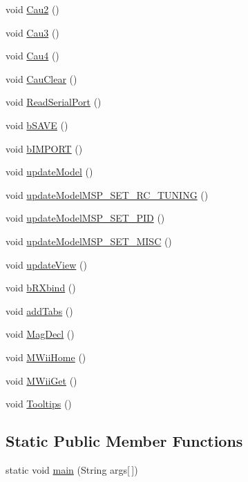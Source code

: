 \begin{DoxyCompactItemize}
\item 
void \hyperlink{classMultiWiiConf_ac0581f16afefe73eda1d9fd3c49619e9}{Cau2} ()
\item 
void \hyperlink{classMultiWiiConf_a390839149da4f3010a44ae9198224d82}{Cau3} ()
\item 
void \hyperlink{classMultiWiiConf_a52188c481473e6840c32819a1bb59b87}{Cau4} ()
\item 
void \hyperlink{classMultiWiiConf_a4f7d659bc40a7a1d3ea1578302f85897}{Cau\-Clear} ()
\item 
void \hyperlink{classMultiWiiConf_acdf30272639726614b0b6c817a61d791}{Read\-Serial\-Port} ()
\item 
void \hyperlink{classMultiWiiConf_a1fce4aba9f4303d1859ed3122f6d6cf5}{b\-S\-A\-V\-E} ()
\item 
void \hyperlink{classMultiWiiConf_a6cdbed88e5d94db4ee58b70f299f5dc0}{b\-I\-M\-P\-O\-R\-T} ()
\item 
void \hyperlink{classMultiWiiConf_ae152c1f5d8b20485ff92a20b8d15f9fb}{update\-Model} ()
\item 
void \hyperlink{classMultiWiiConf_a02f7cd92c516edf9ba014433209c5e66}{update\-Model\-M\-S\-P\-\_\-\-S\-E\-T\-\_\-\-R\-C\-\_\-\-T\-U\-N\-I\-N\-G} ()
\item 
void \hyperlink{classMultiWiiConf_a757bd807090b63a8142667d090b41542}{update\-Model\-M\-S\-P\-\_\-\-S\-E\-T\-\_\-\-P\-I\-D} ()
\item 
void \hyperlink{classMultiWiiConf_a57633ac74ed66b9f52afe79aec9d6f56}{update\-Model\-M\-S\-P\-\_\-\-S\-E\-T\-\_\-\-M\-I\-S\-C} ()
\item 
void \hyperlink{classMultiWiiConf_ac88fe7ed959b47cf8519b35ef8c77c05}{update\-View} ()
\item 
void \hyperlink{classMultiWiiConf_a6325b24efa261211d04156d1c05cfcca}{b\-R\-Xbind} ()
\item 
void \hyperlink{classMultiWiiConf_a5eb513429b08b77f4cb2f656bcaced6f}{add\-Tabs} ()
\item 
void \hyperlink{classMultiWiiConf_a6bc6be0898feb09f6693b7e3b7d3f6fe}{Mag\-Decl} ()
\item 
void \hyperlink{classMultiWiiConf_a9c993ed28846ae789acdbdb93f8f17d7}{M\-Wii\-Home} ()
\item 
void \hyperlink{classMultiWiiConf_a6523326eff761ad689372a4373065e2b}{M\-Wii\-Get} ()
\item 
void \hyperlink{classMultiWiiConf_ace168f10f8c5bf01bc3739f5f218b6e9}{Tooltips} ()
\end{DoxyCompactItemize}
\subsection*{Static Public Member Functions}
\begin{DoxyCompactItemize}
\item 
static void \hyperlink{classMultiWiiConf_a844c042472c9c11dbd805cf36ccebafd}{main} (String args\mbox{[}$\,$\mbox{]})
\end{DoxyCompactItemize}
